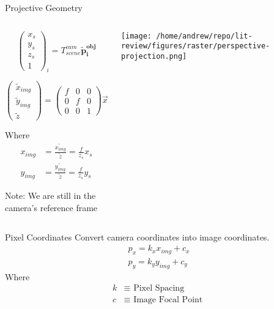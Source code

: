 \documentclass[presentation, aspectratio=1610]{beamer}
\begin{document}
\begin{frame}[label={sec:orgfccad6e}]{Projective Geometry}
\begin{columns}
\begin{column}{0.5\columnwidth}
\begin{equation*}
  \begin{pmatrix}
    x_{s} \\ y_{s} \\ z_{s} \\ 1
  \end{pmatrix}_{i} = T^{cam}_{scene} \mathbf{\tilde{p}^{obj}_{i}}
\end{equation*}

\begin{equation*}
  \begin{pmatrix}
    \tilde{x}_{img} \\ \tilde{y}_{img} \\ \tilde{z}
  \end{pmatrix} =
  \begin{pmatrix}
    f& 0 & 0 \\ 0 & f & 0 \\ 0 & 0 & 1
  \end{pmatrix} \vec{x}_{s}
\end{equation*}

Where
\begin{equation*}
  \begin{aligned}
    x_{img} &= \frac{\tilde{x_{img}}}{\tilde{z}} = \frac{f}{z_{s}}x_{s} \\
    y_{img} &= \frac{\tilde{y_{img}}}{\tilde{z}} = \frac{f}{z_{s}}y_{s}
  \end{aligned}
\end{equation*}

{\tiny Note: We are still in the camera's reference frame}
\end{column}

\begin{column}{0.6\columnwidth}
\begin{center}
\texttt{[image: /home/andrew/repo/lit-review/figures/raster/perspective-projection.png]}
\end{center}
\end{column}
\end{columns}
\end{frame}
\begin{frame}[label={sec:org3753430}]{Pixel Coordinates}
Convert camera coordinates into image coordinates.
\begin{equation*}
  \begin{aligned}
    p_{x} = k_{x}x_{img} + c_{x} \\
    p_{y} = k_{y}y_{img} + c_{y}
  \end{aligned}
\end{equation*}
Where
\begin{equation*}
  \begin{aligned}
    k &\equiv \text{ Pixel Spacing }\\
    c &\equiv \text{ Image Focal Point }
  \end{aligned}
\end{equation*}
\end{frame}
\end{document}
